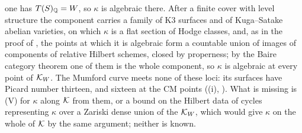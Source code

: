 \begin{remark}
one has $T(S)_{\mathbb{Q}}=W$, so $\kappa$ is algebraic there. After a finite cover
with level structure the component carries a family of K3 surfaces and of
Kuga--Satake abelian varieties, on which $\kappa$ is a flat section of Hodge
classes, and, as in the proof of , the points at which it
is algebraic form a countable union of images of components of relative
Hilbert schemes, closed by properness; by the Baire category theorem one of
them is the whole component, so $\kappa$ is algebraic at every point of
$\mathcal{K}_{W}$. The Mumford curve meets none of these loci: its surfaces have
Picard number thirteen, and sixteen at the CM points
((i), ). What is missing is
\textup{(V)} for $\kappa$ along $\mathcal{K}$ from them, or a bound on the Hilbert data
of cycles representing $\kappa$ over a Zariski dense union of the $\mathcal{K}_{W}$,
which would give $\kappa$ on the whole of $\mathcal{K}$ by the same argument; neither
is known.
\end{remark}
